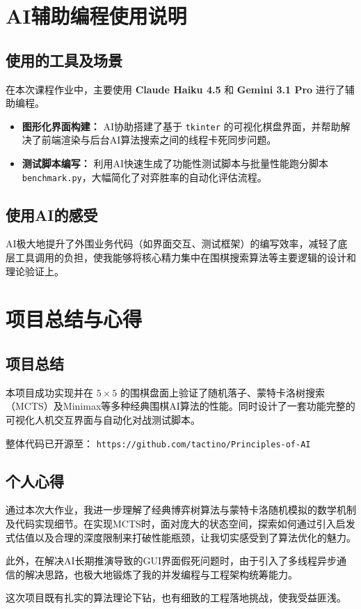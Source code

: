 \documentclass[12pt,a4paper]{ctexart}
\begin{document}
\section{AI辅助编程使用说明}
\subsection{使用的工具及场景}
在本次课程作业中，主要使用 \textbf{Claude Haiku 4.5} 和 \textbf{Gemini 3.1 Pro} 进行了辅助编程。
\begin{itemize}
    \item \textbf{图形化界面构建：} AI协助搭建了基于 \texttt{tkinter} 的可视化棋盘界面，并帮助解决了前端渲染与后台AI算法搜索之间的线程卡死同步问题。
    \item \textbf{测试脚本编写：} 利用AI快速生成了功能性测试脚本与批量性能跑分脚本 \texttt{benchmark.py}，大幅简化了对弈胜率的自动化评估流程。
\end{itemize}

\subsection{使用AI的感受}
AI极大地提升了外围业务代码（如界面交互、测试框架）的编写效率，减轻了底层工具调用的负担，使我能够将核心精力集中在围棋搜索算法等主要逻辑的设计和理论验证上。

\section{项目总结与心得}
\subsection{项目总结}
本项目成功实现并在 $5\times 5$ 的围棋盘面上验证了随机落子、蒙特卡洛树搜索（MCTS）及Minimax等多种经典围棋AI算法的性能。同时设计了一套功能完整的可视化人机交互界面与自动化对战测试脚本。

整体代码已开源至：
\texttt{https://github.com/tactino/Principles-of-AI}

\subsection{个人心得}
通过本次大作业，我进一步理解了经典博弈树算法与蒙特卡洛随机模拟的数学机制及代码实现细节。在实现MCTS时，面对庞大的状态空间，探索如何通过引入启发式估值以及合理的深度限制来打破性能瓶颈，让我切实感受到了算法优化的魅力。

此外，在解决AI长期推演导致的GUI界面假死问题时，由于引入了多线程异步通信的解决思路，也极大地锻炼了我的并发编程与工程架构统筹能力。

这次项目既有扎实的算法理论下钻，也有细致的工程落地挑战，使我受益匪浅。
\end{document}
